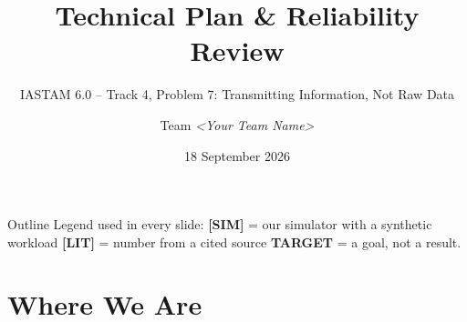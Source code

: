 \documentclass[aspectratio=169,10pt]{beamer}
\title[Problem 7 -- Technical Plan]{Technical Plan \& Reliability Review}
\subtitle{IASTAM 6.0 -- Track 4, Problem 7: Transmitting Information, Not Raw Data}
\author[Team]{Team \textit{<Your Team Name>}}
\institute[IASTAM 6.0]{Computer Engineering -- 2nd year}
\date{18 September 2026}
\newcommand{\SIMtag}{\textcolor{ocean}{\textbf{[SIM]}}}
\newcommand{\LITtag}{\textcolor{muted}{\textbf{[LIT]}}}
\begin{document}
\begin{frame}
  \titlepage
\end{frame}

\begin{frame}{Outline}
  \tableofcontents
  \vspace{3mm}
  {\footnotesize\color{muted}
  Legend used in every slide: \SIMtag{} = our simulator with a synthetic workload \quad
  \LITtag{} = number from a cited source \quad \textbf{TARGET} = a goal, not a result.}
\end{frame}

\section{Where We Are}
\end{document}
